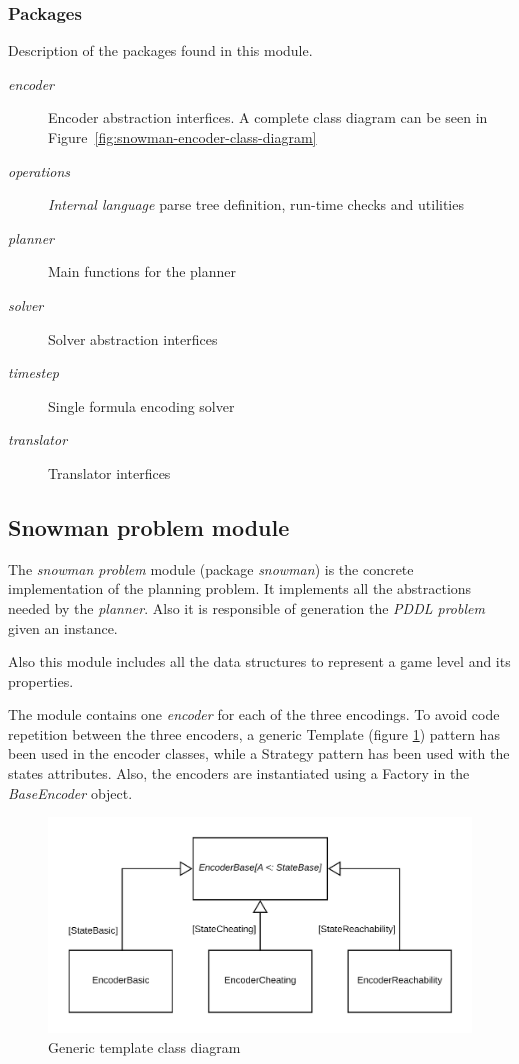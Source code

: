 \documentclass{report}
\theoremstyle{plain}
\begin{document}
\subsubsection{Packages}
Description of the packages found in this module.
\begin{description}
    \item[\emph{encoder}] Encoder abstraction interfices. A complete class diagram can be seen in Figure~\ref{fig:snowman-encoder-class-diagram}
    \item[\emph{operations}] \emph{Internal language} parse tree definition, run-time checks and utilities
    \item[\emph{planner}] Main functions for the planner
    \item[\emph{solver}] Solver abstraction interfices
    \item[\emph{timestep}] Single formula encoding solver
    \item[\emph{translator}] Translator interfices
\end{description}

\subsection{Snowman problem module}
The \emph{snowman problem} module (package \emph{snowman}) is the concrete implementation of the planning problem. It implements all the abstractions needed by the \emph{planner}. Also it is responsible of generation the \emph{PDDL problem} given an instance.

Also this module includes all the data structures to represent a game level and its properties. 

The module contains one \emph{encoder} for each of the three encodings. To avoid code repetition between the three encoders, a generic Template (figure \ref{fig:template}) pattern has been used in the encoder classes, while a Strategy pattern has been used with the states attributes. Also, the encoders are instantiated using a Factory in the \textit{BaseEncoder} object.

\begin{figure}
    \centering
    \includegraphics[scale=0.25]{template-class-diagram.png}
    \caption{Generic template class diagram}
    \label{fig:template}
\end{figure}
\end{document}

